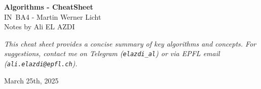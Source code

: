 \documentclass[5pt]{extarticle}
\begin{document}
\begin{titlepage}
    \centering
    \vspace*{0.5cm}
    {\Huge \textbf{Algorithms - CheatSheet}}\\[-2pt]
    {\LARGE IN~BA4 - Martin Werner Licht}\\[-2pt]
    {\Large Notes by Ali EL AZDI}\\[2pt]
    \vfill
    \begin{justify}
        \textit{This cheat sheet provides a concise summary of key algorithms and concepts. For suggestions, contact me on Telegram (\texttt{elazdi\_al}) or via EPFL email (\texttt{ali.elazdi@epfl.ch}).}
    \end{justify}
    \vspace*{0.5cm}
    {\large March 25th, 2025}
\end{titlepage}
\small
\end{document}

